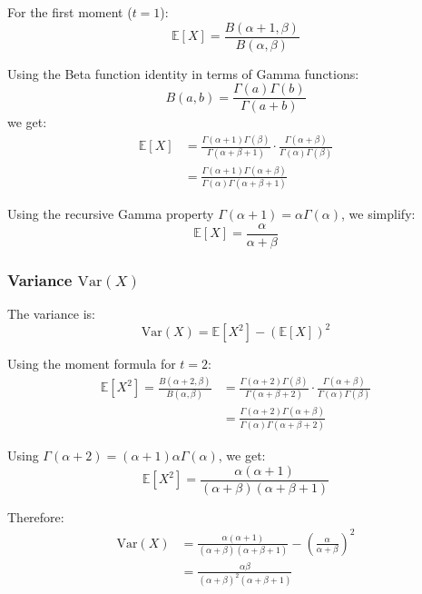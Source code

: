 For the first moment (\(t = 1\)):
\begin{equation}
\mathbb{E}[X] = \frac{B(\alpha + 1, \beta)}{B(\alpha, \beta)}
\end{equation}

Using the Beta function identity in terms of Gamma functions:
\begin{equation}
B(a, b) = \frac{\Gamma(a) \Gamma(b)}{\Gamma(a + b)}
\end{equation}
we get:
\begin{align}
\mathbb{E}[X] &= \frac{\Gamma(\alpha + 1) \Gamma(\beta)}{\Gamma(\alpha + \beta + 1)} \cdot \frac{\Gamma(\alpha + \beta)}{\Gamma(\alpha) \Gamma(\beta)} \\
&= \frac{\Gamma(\alpha + 1) \Gamma(\alpha + \beta)}{\Gamma(\alpha) \Gamma(\alpha + \beta + 1)}
\end{align}

Using the recursive Gamma property \(\Gamma(\alpha + 1) = \alpha \Gamma(\alpha)\), we simplify:
\begin{equation}
\mathbb{E}[X] = \frac{\alpha}{\alpha + \beta}
\end{equation}

\subsubsection*{Variance \(\text{Var}(X)\)}

The variance is:
\begin{equation}
\text{Var}(X) = \mathbb{E}[X^2] - (\mathbb{E}[X])^2
\end{equation}

Using the moment formula for \(t = 2\):
\begin{align}
\mathbb{E}[X^2] = \frac{B(\alpha + 2, \beta)}{B(\alpha, \beta)} &= \frac{\Gamma(\alpha + 2) \Gamma(\beta)}{\Gamma(\alpha + \beta + 2)} \cdot \frac{\Gamma(\alpha + \beta)}{\Gamma(\alpha) \Gamma(\beta)} \\
&= \frac{\Gamma(\alpha + 2) \Gamma(\alpha + \beta)}{\Gamma(\alpha) \Gamma(\alpha + \beta + 2)}
\end{align}

Using \(\Gamma(\alpha + 2) = (\alpha + 1) \alpha \Gamma(\alpha)\), we get:
\begin{equation}
\mathbb{E}[X^2] = \frac{\alpha (\alpha + 1)}{(\alpha + \beta)(\alpha + \beta + 1)}
\end{equation}

Therefore:
\begin{align}
\text{Var}(X) &= \frac{\alpha (\alpha + 1)}{(\alpha + \beta)(\alpha + \beta + 1)} - \left( \frac{\alpha}{\alpha + \beta} \right)^2 \\
&= \frac{\alpha \beta}{(\alpha + \beta)^2 (\alpha + \beta + 1)}
\end{align}

